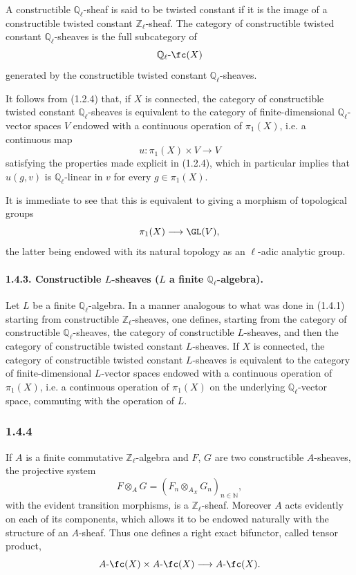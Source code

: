 A constructible \(\mathbb Q_\ell\)-sheaf is said to be twisted constant if it is the image of a constructible twisted constant \(\mathbb Z_\ell\)-sheaf. The category of constructible twisted constant \(\mathbb Q_\ell\)-sheaves is the full subcategory of
\[
\mathbb Q_\ell\text{-}\fc(X)
\]
generated by the constructible twisted constant \(\mathbb Q_\ell\)-sheaves.

It follows from (1.2.4) that, if \(X\) is connected, the category of constructible twisted constant \(\mathbb Q_\ell\)-sheaves is equivalent to the category of finite-dimensional \(\mathbb Q_\ell\)-vector spaces \(V\) endowed with a continuous operation of \(\pi_1(X)\), i.e. a continuous map
\[
u:\pi_1(X)\times V\longrightarrow V
\]
satisfying the properties made explicit in (1.2.4), which in particular implies that \(u(g,v)\) is \(\mathbb Q_\ell\)-linear in \(v\) for every \(g\in\pi_1(X)\).

It is immediate to see that this is equivalent to giving a morphism of topological groups
\[
\pi_1(X)\longrightarrow \GL(V),
\]
the latter being endowed with its natural topology as an \(\ell\)-adic analytic group.

\paragraph{1.4.3. Constructible \(L\)-sheaves (\(L\) a finite \(\mathbb Q_\ell\)-algebra).}
Let \(L\) be a finite \(\mathbb Q_\ell\)-algebra. In a manner analogous to what was done in (1.4.1) starting from constructible \(\mathbb Z_\ell\)-sheaves, one defines, starting from the category of constructible \(\mathbb Q_\ell\)-sheaves, the category of constructible \(L\)-sheaves, and then the category of constructible twisted constant \(L\)-sheaves. If \(X\) is connected, the category of constructible twisted constant \(L\)-sheaves is equivalent to the category of finite-dimensional \(L\)-vector spaces endowed with a continuous operation of \(\pi_1(X)\), i.e. a continuous operation of \(\pi_1(X)\) on the underlying \(\mathbb Q_\ell\)-vector space, commuting with the operation of \(L\).

\subsubsection*{1.4.4}
If \(A\) is a finite commutative \(\mathbb Z_\ell\)-algebra and \(F\), \(G\) are two constructible \(A\)-sheaves, the projective system
\[
F\otimes_A G=(F_n\otimes_{A_X} G_n)_{n\in\mathbb N},
\]
with the evident transition morphisms, is a \(\mathbb Z_\ell\)-sheaf. Moreover \(A\) acts evidently on each of its components, which allows it to be endowed naturally with the structure of an \(A\)-sheaf. Thus one defines a right exact bifunctor, called tensor product,
\[
A\text{-}\fc(X)\times A\text{-}\fc(X)\longrightarrow A\text{-}\fc(X).
\]


